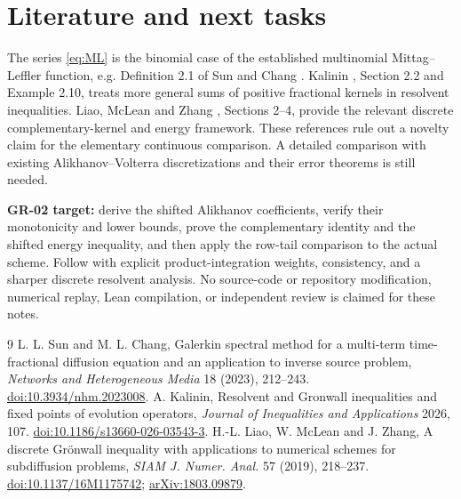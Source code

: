 \documentclass[11pt,a4paper]{article}
\begin{document}
\section{Literature and next tasks}
The series \eqref{eq:ML} is the binomial case of the established multinomial Mittag--Leffler function, e.g. Definition 2.1 of Sun and Chang \cite{sun}. Kalinin \cite{kalinin}, Section 2.2 and Example 2.10, treats more general sums of positive fractional kernels in resolvent inequalities. Liao, McLean and Zhang \cite{liao}, Sections 2--4, provide the relevant discrete complementary-kernel and energy framework. These references rule out a novelty claim for the elementary continuous comparison. A detailed comparison with existing Alikhanov--Volterra discretizations and their error theorems is still needed.

\textbf{GR-02 target:} derive the shifted Alikhanov coefficients, verify their monotonicity and lower bounds, prove the complementary identity and the shifted energy inequality, and then apply the row-tail comparison to the actual scheme. Follow with explicit product-integration weights, consistency, and a sharper discrete resolvent analysis. No source-code or repository modification, numerical replay, Lean compilation, or independent review is claimed for these notes.
\begin{thebibliography}{9}
 L. L. Sun and M. L. Chang, Galerkin spectral method for a multi-term time-fractional diffusion equation and an application to inverse source problem, \emph{Networks and Heterogeneous Media} 18 (2023), 212--243. \href{https://doi.org/10.3934/nhm.2023008}{doi:10.3934/nhm.2023008}.
 A. Kalinin, Resolvent and Gronwall inequalities and fixed points of evolution operators, \emph{Journal of Inequalities and Applications} 2026, 107. \href{https://doi.org/10.1186/s13660-026-03543-3}{doi:10.1186/s13660-026-03543-3}.
 H.-L. Liao, W. McLean and J. Zhang, A discrete Gr\"onwall inequality with applications to numerical schemes for subdiffusion problems, \emph{SIAM J. Numer. Anal.} 57 (2019), 218--237. \href{https://doi.org/10.1137/16M1175742}{doi:10.1137/16M1175742}; \href{https://arxiv.org/abs/1803.09879}{arXiv:1803.09879}.
\end{thebibliography}
\end{document}
